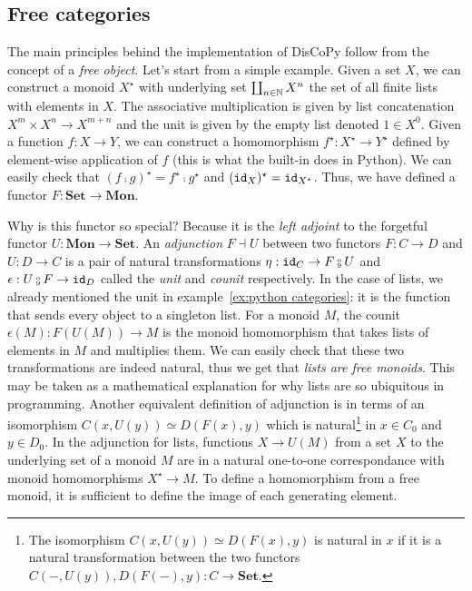 \subsection{Free categories}\label{subsection:free-categories}

The main principles behind the implementation of DisCoPy follow from the concept of a \emph{free object}.
Let's start from a simple example.
Given a set $X$, we can construct a monoid $X^\star$ with underlying set $\coprod_{n \in \mathbb{N}} X^n$ the set of all finite lists with elements in $X$.
The associative multiplication is given by list concatenation $X^m \times X^n \to X^{m + n}$ and the unit is given by the empty list denoted $1 \in X^0$.
Given a function $f : X \to Y$, we can construct a homomorphism $f^\star : X^\star \to Y^\star$ defined by element-wise application of $f$ (this is what the built-in  does in Python).
We can easily check that $(f \fcmp g)^\star = f^\star \fcmp g^\star$ and $(\mathtt{id}_X)^\star = \mathtt{id}_{X^\star}$.
Thus, we have defined a functor $F : \mathbf{Set} \to \mathbf{Mon}$.

Why is this functor so special? Because it is the \emph{left adjoint} to the forgetful functor $U : \mathbf{Mon} \to \mathbf{Set}$.
An \emph{adjunction} $F \dashv U$ between two functors $F : C \to D$ and $U : D \to C$ is a pair of natural transformations $\eta : \id_C \to F \fcmp U$ and $\epsilon : U \fcmp F \to \id_D$ called the \emph{unit} and \emph{counit} respectively.
In the case of lists, we already mentioned the unit in example~\ref{ex:python categories}: it is the function that sends every object to a singleton list.
For a monoid $M$, the counit $\epsilon(M) : F(U(M)) \to M$ is the monoid homomorphism that takes lists of elements in $M$ and multiplies them.
We can easily check that these two transformations are indeed natural, thus we get that \emph{lists are free monoids}.
This may be taken as a mathematical explanation for why lists are so ubiquitous in programming.
Another equivalent definition of adjunction is in terms of an isomorphism $C(x, U(y)) \simeq D(F(x), y)$ which is natural\footnote
{The isomorphism $C(x, U(y)) \simeq D(F(x), y)$ is natural in $x$ if it is a natural transformation between the two functors $C(-, U(y)), D(F(-), y) : C \to \mathbf{Set}$.}
in $x \in C_0$ and $y \in D_0$.
In the adjunction for lists, functions $X \to U(M)$ from a set $X$ to the underlying set of a monoid $M$ are in a natural one-to-one correspondance with monoid homomorphisms $X^\star \to M$.
To define a homomorphism from a free monoid, it is sufficient to define the image of each generating element.


